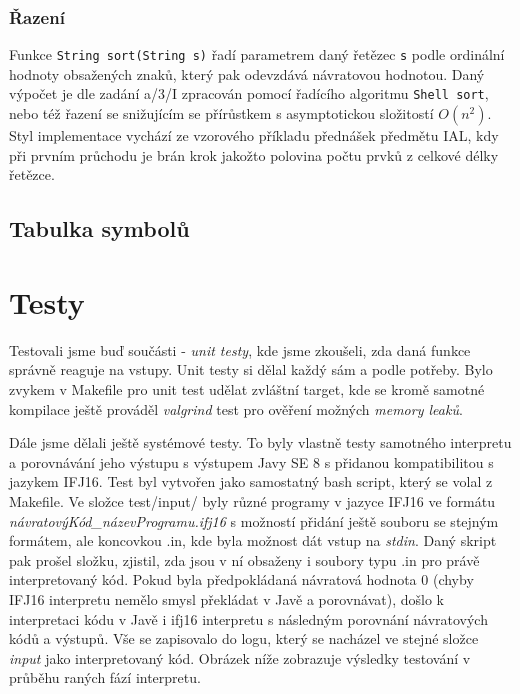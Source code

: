 \documentclass[a4paper,11pt]{article}
\begin{document}
\subsubsection {Řazení}
Funkce \texttt{String sort(String s)} řadí parametrem daný řetězec \texttt{s} podle ordinální hodnoty obsažených znaků, který pak odevzdává návratovou hodnotou. Daný výpočet je dle zadání a/3/I zpracován pomocí řadícího algoritmu \texttt{Shell sort}, nebo též řazení se snižujícím se přírůstkem s asymptotickou složitostí $O(n^{2})$. Styl implementace vychází ze vzorového příkladu přednášek předmětu IAL, kdy při prvním průchodu je brán krok jakožto polovina počtu prvků z celkové délky řetězce.

\subsection{Tabulka symbolů}


\section{Testy}
Testovali jsme buď součásti - \textit{unit testy}, kde jsme zkoušeli, zda daná funkce správně reaguje na vstupy. Unit testy si dělal každý sám a podle potřeby. Bylo zvykem v Makefile pro unit test udělat zvláštní target, kde se kromě samotné kompilace ještě prováděl \textit{valgrind} test pro ověření možných \textit{memory leaků}. 

Dále jsme dělali ještě systémové testy. To byly vlastně testy samotného interpretu a porovnávání jeho výstupu s výstupem Javy SE 8 s přidanou kompatibilitou s jazykem IFJ16. Test byl vytvořen jako samostatný bash script, který se volal z Makefile. Ve složce test/input/ byly různé programy v jazyce IFJ16 ve formátu \textit{návratovýKód\_názevProgramu.ifj16} s možností přidání ještě souboru se stejným formátem, ale koncovkou .in, kde byla možnost dát vstup na \textit{stdin}. Daný skript pak prošel složku, zjistil, zda jsou v ní obsaženy i soubory typu .in pro právě interpretovaný kód. Pokud byla předpokládaná návratová hodnota 0 (chyby IFJ16 interpretu nemělo smysl překládat v Javě a porovnávat), došlo k interpretaci kódu v Javě i ifj16 interpretu s následným porovnání návratových kódů a výstupů. Vše se zapisovalo do logu, který se nacházel ve stejné složce \textit{input} jako interpretovaný kód. Obrázek níže zobrazuje výsledky testování v průběhu raných fází interpretu.\\

\end{document}
